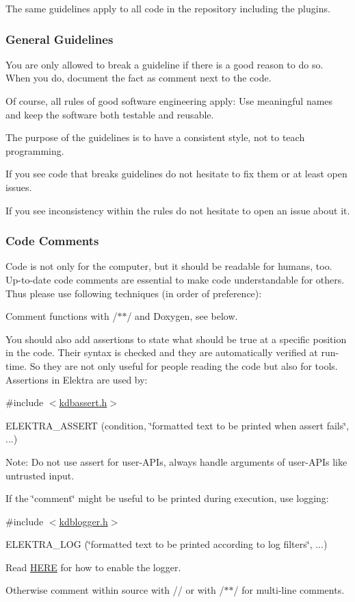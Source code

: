 The same guidelines apply to all code in the repository including the plugins.

\subsubsection*{General Guidelines}

You are only allowed to break a guideline if there is a good reason to do so. When you do, document the fact as comment next to the code.

Of course, all rules of good software engineering apply\+: Use meaningful names and keep the software both testable and reusable.

The purpose of the guidelines is to have a consistent style, not to teach programming.

If you see code that breaks guidelines do not hesitate to fix them or at least open issues.

If you see inconsistency within the rules do not hesitate to open an issue about it.

\subsubsection*{Code Comments}

Code is not only for the computer, but it should be readable for humans, too. Up-\/to-\/date code comments are essential to make code understandable for others. Thus please use following techniques (in order of preference)\+:


\begin{DoxyEnumerate}
\item Comment functions with {\ttfamily /$\ast$$\ast$/} and Doxygen, see below.
\item You should also add assertions to state what should be true at a specific position in the code. Their syntax is checked and they are automatically verified at run-\/time. So they are not only useful for people reading the code but also for tools. Assertions in Elektra are used by\+:

{\ttfamily \#include $<$\hyperlink{kdbassert_8h}{kdbassert.\+h}$>$}

{\ttfamily E\+L\+E\+K\+T\+R\+A\+\_\+\+A\+S\+S\+E\+RT (condition, \char`\"{}formatted text to be printed when assert fails\char`\"{}, ...)}

Note\+: Do not use assert for user-\/\+A\+P\+Is, always handle arguments of user-\/\+A\+P\+Is like untrusted input.
\item If the \char`\"{}comment\char`\"{} might be useful to be printed during execution, use logging\+:

{\ttfamily \#include $<$\hyperlink{kdblogger_8h}{kdblogger.\+h}$>$}

{\ttfamily E\+L\+E\+K\+T\+R\+A\+\_\+\+L\+OG (\char`\"{}formatted text to be printed according to log filters\char`\"{}, ...)}

Read \hyperlink{doc_dev_logging_md}{H\+E\+RE} for how to enable the logger.
\item Otherwise comment within source with {\ttfamily //} or with {\ttfamily /$\ast$$\ast$/} for multi-\/line comments.
\end{DoxyEnumerate}

